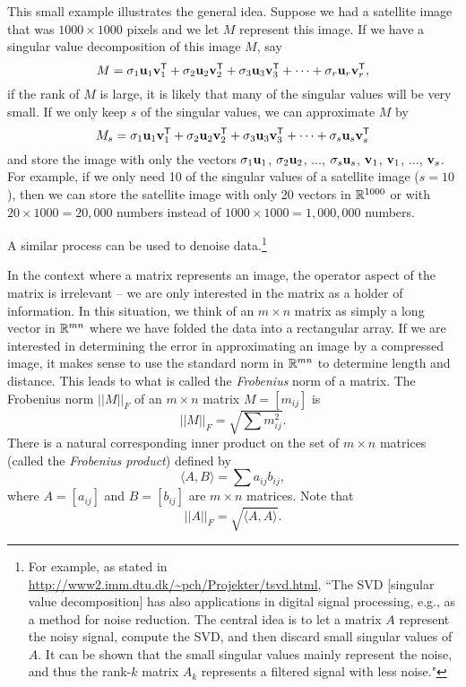 This small example illustrates the general idea. Suppose we had a satellite image that was $1000 \times 1000$ pixels and we let $M$ represent this image. If we have a singular value decomposition of this image $M$, say
\[M = \sigma_1 \mathbf{u}_1\mathbf{v}_1^{\mathsf{T}} + \sigma_2 \mathbf{u}_2\mathbf{v}_2^{\mathsf{T}} + \sigma_3 \mathbf{u}_3\mathbf{v}_3^{\mathsf{T}} + \cdots + \sigma_{r} \mathbf{u}_{r}\mathbf{v}_{r}^{\mathsf{T}},\]
if the rank of $M$ is large, it is likely that many of the singular values will be very small. If we only keep $s$ of the singular values, we can approximate $M$ by
\[M_s = \sigma_1 \mathbf{u}_1\mathbf{v}_1^{\mathsf{T}} + \sigma_2 \mathbf{u}_2\mathbf{v}_2^{\mathsf{T}} + \sigma_3 \mathbf{u}_3\mathbf{v}_3^{\mathsf{T}} + \cdots + \sigma_{s} \mathbf{u}_{s}\mathbf{v}_{s}^{\mathsf{T}}\]
and store the image with only the vectors $\sigma_1 \mathbf{u}_1$, $\sigma_2 \mathbf{u}_2$, $\ldots$, $\sigma_{s}\mathbf{u}_s$, $\mathbf{v}_1$, $\mathbf{v}_1$, $\ldots$, $\mathbf{v}_s$.
For example, if we only need 10 of the singular values of a satellite image ($s = 10$), then we can store the satellite image with only 20 vectors in $\mathbb{R}^{1000}$ or with $20 \times 1000 = 20,000$ numbers instead of $1000 \times 1000 = 1,000,000$ numbers.

A similar process can be used to denoise data.\footnote{For example, as stated in \url{http://www2.imm.dtu.dk/~pch/Projekter/tsvd.html}, ``The SVD [singular value decomposition] has also applications in digital signal processing, e.g., as a method for noise reduction. The central idea is to let a matrix $A$ represent the noisy signal, compute the SVD, and then discard small singular values of $A$. It can be shown that the small singular values mainly represent the noise, and thus the rank-$k$ matrix $A_k$ represents a filtered signal with less noise."}


In the context where a matrix represents an image, the operator aspect of the matrix is irrelevant -- we are only interested in the matrix as a holder of information. In this situation, we think of an $m \times n$ matrix as simply a long vector in $\mathbb{R}^{mn}$ where we have folded the data into a rectangular array. If we are interested in determining the error in approximating an image by a compressed image, it makes sense to use the standard norm in $\mathbb{R}^{mn}$ to determine length and distance. This leads to what is called the \emph{Frobenius} norm of a matrix. The Frobenius norm $||M||_F$ of an $m \times n$ matrix $M = [m_{ij}]$ is
\[||M||_F = \sqrt{ \sum m_{ij}^2 }.\]
There is a natural corresponding inner product on the set of $m \times n$ matrices (called the \emph{Frobenius product}) defined by
\[\langle A,B \rangle = \sum a_{ij}b_{ij},\]
where $A = [a_{ij}]$ and $B = [b_{ij}]$ are $m \times n$ matrices.%
Note that
\[||A||_F = \sqrt{\langle A, A\rangle}.\]

